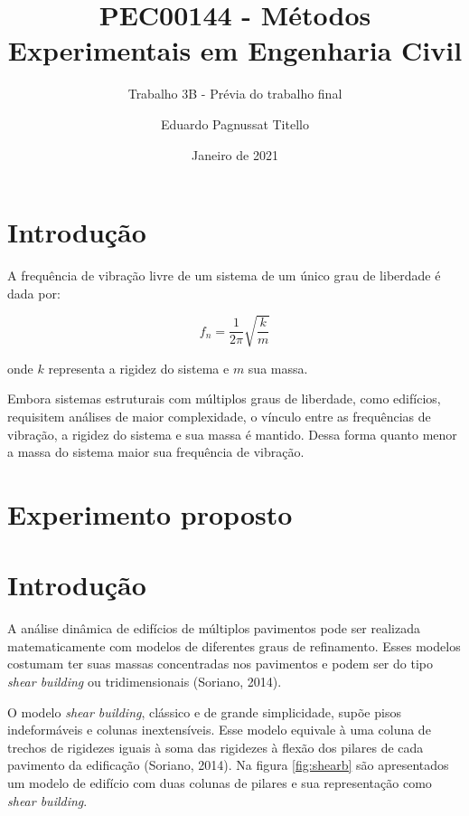 

\author{Eduardo Pagnussat Titello}
\title{PEC00144 - Métodos Experimentais em Engenharia Civil}
\subtitle{Trabalho 3B - Prévia do trabalho final}
\date{Janeiro de 2021}



	
\maketitle



\section{Introdução}
A frequência de vibração livre de um sistema de um único grau de liberdade é dada por: 

\begin{equation}
	f_n = \frac{1}{2\pi} \sqrt{\frac{k}{m}}
	\label{eq:fn}
\end{equation}

onde $k$ representa a rigidez do sistema e $m$ sua massa.

Embora sistemas estruturais com múltiplos graus de liberdade, como edifícios, requisitem análises de maior complexidade, o vínculo entre as frequências de vibração, a rigidez do sistema e sua massa é mantido. Dessa forma quanto menor a massa do sistema maior sua frequência de vibração. 


\section{Experimento proposto}



\section{Introdução}
A análise dinâmica de edifícios de múltiplos pavimentos pode ser realizada matematicamente com modelos de diferentes graus de refinamento. Esses modelos costumam ter suas massas concentradas nos pavimentos e podem ser do tipo \textit{shear building} ou tridimensionais (Soriano, 2014).

O modelo \textit{shear building}, clássico e de grande simplicidade, supõe pisos indeformáveis e colunas inextensíveis. Esse modelo equivale à uma coluna de trechos de rigidezes iguais à soma das rigidezes à flexão dos pilares de cada pavimento da edificação (Soriano, 2014). Na figura \ref{fig:shearb} são apresentados um modelo de edifício com duas colunas de pilares e sua representação como \textit{shear building}.


